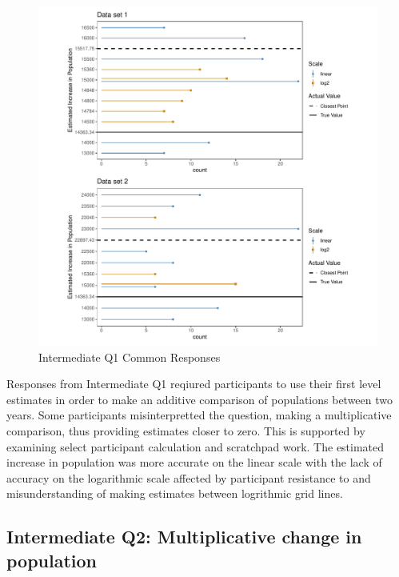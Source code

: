 \documentclass[print]{nuthesis}
\begin{document}
\begin{figure}[tbp]

{\centering \includegraphics[width=1\linewidth,]{thesis_files/figure-latex/qi1-common-responses-1} 

}

\caption{Intermediate Q1 Common Responses}\label{fig:qi1-common-responses}
\end{figure}

Responses from Intermediate Q1 reqiured participants to use their first level estimates in order to make an additive comparison of populations between two years.
Some participants misinterpretted the question, making a multiplicative comparison, thus providing estimates closer to zero.
This is supported by examining select participant calculation and scratchpad work.
The estimated increase in population was more accurate on the linear scale with the lack of accuracy on the logarithmic scale affected by participant resistance to and misunderstanding of making estimates between logrithmic grid lines.

\hypertarget{intermediate-q2-multiplicative-change-in-population}{%
\subsection{Intermediate Q2: Multiplicative change in population}\label{intermediate-q2-multiplicative-change-in-population}}
\end{document}
